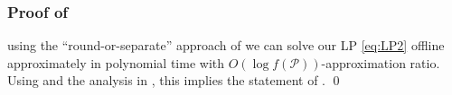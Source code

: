 \documentclass[11pt]{article}
\newcommand{\cP}{{\mathcal{P}}}
\begin{document}
	
	\subsubsection*{Proof of }
	
	using the ``round-or-separate''
	approach of \cite{gupta2020online} we can solve our LP \eqref{eq:LP2} offline approximately in polynomial time with $O(\log f(\cP))$-approximation ratio. Using   and the analysis in , this implies the statement of .  \qed
\end{document}

